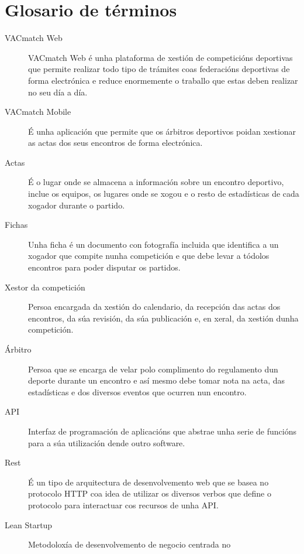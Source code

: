\chapter{Glosario de términos}
\label{chap:glosario-terminos}


\begin{description}
  \item [VACmatch Web] VACmatch Web é unha plataforma de xestión de 
competicións deportivas que 
permite realizar todo tipo de trámites coas federacións deportivas de forma electrónica e 
reduce enormemente o traballo que estas deben realizar no seu día a día.
  \item [VACmatch Mobile] É unha aplicación que permite que os árbitros 
deportivos 
poidan xestionar as actas dos seus encontros de forma electrónica.
  \item [Actas] É o lugar onde se almacena a información sobre un encontro 
deportivo, inclue os equipos, os lugares onde se xogou e o resto de estadísticas de cada 
xogador durante o partido.
  \item [Fichas] Unha ficha é un documento con fotografía incluida que identifica a un 
xogador que compite nunha competición e que debe levar a tódolos encontros para poder 
disputar os partidos.
  \item [Xestor da competición] Persoa encargada da xestión do calendario, da recepción 
das actas dos encontros, da súa revisión, da súa publicación e, en xeral, da xestión dunha 
competición.
  \item [Árbitro] Persoa que se encarga de velar polo complimento do regulamento dun 
deporte durante un encontro e así mesmo debe tomar nota na acta, das estadísticas e dos 
diversos eventos que ocurren nun encontro.
 \item [API] Interfaz de programación de aplicacións que abstrae unha serie de 
funcións para a súa utilización dende outro software.
 \item [Rest] É un tipo de arquitectura de desenvolvemento web que se basea 
no protocolo HTTP coa idea de utilizar os diversos verbos que define o 
protocolo para interactuar cos recursos de unha API.
 \item [Lean Startup] Metodoloxía de desenvolvemento de negocio centrada no 

\end{description}
